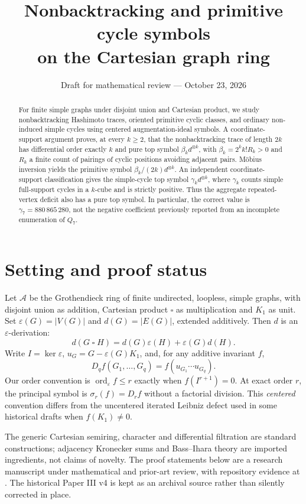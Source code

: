 \documentclass[11pt]{amsart}
\title[Nonbacktracking and primitive cycle symbols]{Nonbacktracking and primitive cycle symbols\\ on the Cartesian graph ring}
\date{Draft for mathematical review --- October 23, 2026}
\DeclareMathOperator{\ord}{ord}
\newcommand{\eps}{\varepsilon}
\newcommand{\sq}{\mathbin{\square}}
\theoremstyle{definition}
\theoremstyle{remark}
\begin{document}
\begin{abstract}
For finite simple graphs under disjoint union and Cartesian product, we
study nonbacktracking Hashimoto traces, oriented primitive cyclic classes,
and ordinary non-induced simple cycles using centered augmentation-ideal
symbols. A coordinate-support argument proves, at every $k\ge2$, that the
nonbacktracking trace of length $2k$ has differential order exactly $k$
and pure top symbol $\beta_k d^{\otimes k}$, with
$\beta_k=2^k k!R_k>0$ and $R_k$ a finite count of pairings of cyclic
positions avoiding adjacent pairs. M\"obius inversion yields the primitive
symbol $\beta_k/(2k)d^{\otimes k}$. An independent coordinate-support
classification gives the simple-cycle top symbol
$\gamma_k d^{\otimes k}$, where $\gamma_k$ counts simple full-support
cycles in a $k$-cube and is strictly positive. Thus the aggregate
repeated-vertex deficit also has a pure top symbol. In particular, the
correct value is $\gamma_7=880\,865\,280$, not the negative coefficient
previously reported from an incomplete enumeration of $Q_7$.
\end{abstract}
\maketitle
\tableofcontents

\section{Setting and proof status}
Let $\mathcal A$ be the Grothendieck ring of finite undirected, loopless,
simple graphs, with disjoint union as addition, Cartesian product $\sq$
as multiplication and $K_1$ as unit. Set $\eps(G)=|V(G)|$ and
$d(G)=|E(G)|$, extended additively. Then $d$ is an $\eps$-derivation:
\begin{equation}\label{eq:der}
d(G\sq H)=d(G)\eps(H)+\eps(G)d(H).
\end{equation}
Write $I=\ker\eps$, $u_G=G-\eps(G)K_1$, and, for any additive invariant $f$,
\begin{equation}\label{eq:center}
D_q f(G_1,\ldots,G_q)=f(u_{G_1}\cdots u_{G_q}).
\end{equation}
Our order convention is $\ord_\eps f\le r$ exactly when
$f(I^{r+1})=0$. At exact order $r$, the principal symbol is
$\sigma_r(f)=D_r f$ without a factorial division. This \emph{centered}
convention differs from the uncentered iterated Leibniz defect used in
some historical drafts when $f(K_1)\ne0$.

The generic Cartesian semiring, character and differential filtration are
standard constructions; adjacency Kronecker sums and Bass--Ihara theory
are imported ingredients, not claims of novelty. The proof statements below
are a research manuscript under mathematical and prior-art review, with
repository evidence at \cite{GPR}. The historical Paper III v4 is kept as
an archival source rather than silently corrected in place.
\end{document}
